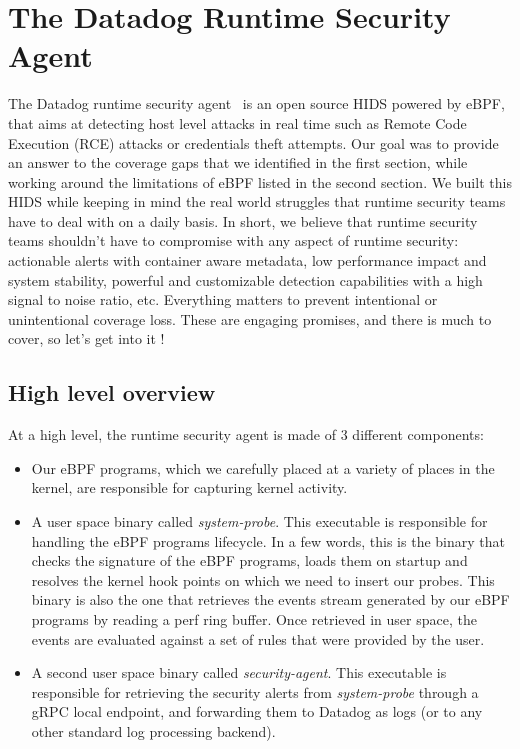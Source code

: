 \section{The Datadog Runtime Security Agent}

The Datadog runtime security agent~\cite{RuntimeSecurityMonitoringWithEBPF:DatadogAgent} is an open source HIDS powered by eBPF, that aims at detecting host level attacks in real time such as Remote Code Execution (RCE) attacks or credentials theft attempts.
Our goal was to provide an answer to the coverage gaps that we identified in the first section, while working around the limitations of eBPF listed in the second section.
We built this HIDS while keeping in mind the real world struggles that runtime security teams have to deal with on a daily basis.
In short, we believe that runtime security teams shouldn’t have to compromise with any aspect of runtime security: actionable alerts with container aware metadata, low performance impact and system stability, powerful and customizable detection capabilities with a high signal to noise ratio, etc.
Everything matters to prevent intentional or unintentional coverage loss.
These are engaging promises, and there is much to cover, so let’s get into it !

\subsection{High level overview}

At a high level, the runtime security agent is made of 3 different components:

\begin{itemize}
  \item Our eBPF programs, which we carefully placed at a variety of places in the kernel, are responsible for capturing kernel activity.
  \item A user space binary called \emph{system-probe}.
  This executable is responsible for handling the eBPF programs lifecycle.
  In a few words, this is the binary that checks the signature of the eBPF programs, loads them on startup and resolves the kernel hook points on which we need to insert our probes.
  This binary is also the one that retrieves the events stream generated by our eBPF programs by reading a perf ring buffer.
  Once retrieved in user space, the events are evaluated against a set of rules that were provided by the user.
  \item A second user space binary called \emph{security-agent}.
  This executable is responsible for retrieving the security alerts from \emph{system-probe} through a gRPC local endpoint, and forwarding them to Datadog as logs (or to any other standard log processing backend).
\end{itemize}


